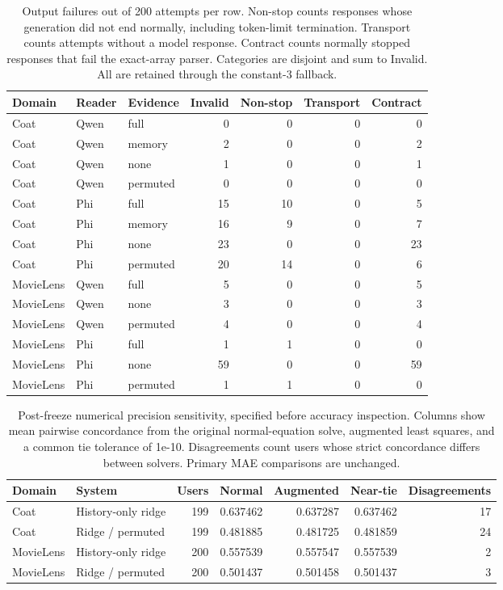 \begin{table}[t]
\centering\small
\caption{Output failures out of 200 attempts per row. Non-stop counts responses whose generation did not end normally, including token-limit termination. Transport counts attempts without a model response. Contract counts normally stopped responses that fail the exact-array parser. Categories are disjoint and sum to Invalid. All are retained through the constant-3 fallback.}
\label{tab:format-failures}
\begin{tabular}{lllrrrr}
\toprule
Domain & Reader & Evidence & Invalid & Non-stop & Transport & Contract\\
\midrule
Coat & Qwen & full & 0 & 0 & 0 & 0\\
Coat & Qwen & memory & 2 & 0 & 0 & 2\\
Coat & Qwen & none & 1 & 0 & 0 & 1\\
Coat & Qwen & permuted & 0 & 0 & 0 & 0\\
Coat & Phi & full & 15 & 10 & 0 & 5\\
Coat & Phi & memory & 16 & 9 & 0 & 7\\
Coat & Phi & none & 23 & 0 & 0 & 23\\
Coat & Phi & permuted & 20 & 14 & 0 & 6\\
MovieLens & Qwen & full & 5 & 0 & 0 & 5\\
MovieLens & Qwen & none & 3 & 0 & 0 & 3\\
MovieLens & Qwen & permuted & 4 & 0 & 0 & 4\\
MovieLens & Phi & full & 1 & 1 & 0 & 0\\
MovieLens & Phi & none & 59 & 0 & 0 & 59\\
MovieLens & Phi & permuted & 1 & 1 & 0 & 0\\
\bottomrule
\end{tabular}
\end{table}

\begin{table}[t]
\centering\small
\caption{Post-freeze numerical precision sensitivity, specified before accuracy inspection. Columns show mean pairwise concordance from the original normal-equation solve, augmented least squares, and a common tie tolerance of 1e-10. Disagreements count users whose strict concordance differs between solvers. Primary MAE comparisons are unchanged.}
\label{tab:precision}
\begin{tabular}{llrrrrr}
\toprule
Domain & System & Users & Normal & Augmented & Near-tie & Disagreements\\
\midrule
Coat & History-only ridge & 199 & 0.637462 & 0.637287 & 0.637462 & 17\\
Coat & Ridge / permuted & 199 & 0.481885 & 0.481725 & 0.481859 & 24\\
MovieLens & History-only ridge & 200 & 0.557539 & 0.557547 & 0.557539 & 2\\
MovieLens & Ridge / permuted & 200 & 0.501437 & 0.501458 & 0.501437 & 3\\
\bottomrule
\end{tabular}
\end{table}
